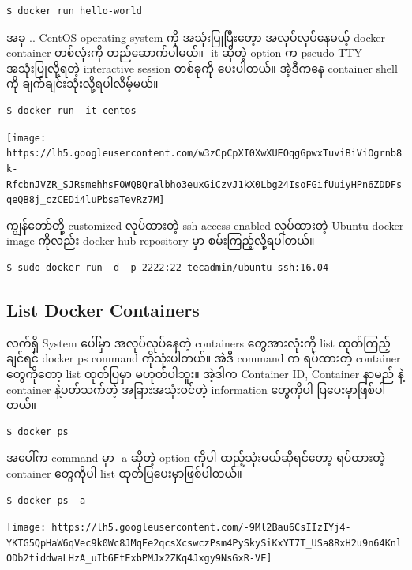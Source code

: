 \documentclass{article}
\begin{document}
\begin{verbatim}
$ docker run hello-world
\end{verbatim}

အခု .. CentOS operating system ကို အသုံးပြုပြီးတေ့ာ အလုပ်လုပ်နေမယ့်
docker container တစ်လုံးကို တည်ဆောက်ပါမယ်။ -it ဆိုတဲ့ option က
pseudo-TTY အသုံးပြုလို့ရတဲ့ interactive session တစ်ခုကို ပေးပါတယ်။
အဲ့ဒီကနေ container shell ကို ချက်ချင်းသုံးလို့ရပါလိမ့်မယ်။

\begin{verbatim}
$ docker run -it centos
\end{verbatim}

\texttt{[image: https://lh5.googleusercontent.com/w3zCpCpXI0XwXUEOqgGpwxTuviBiViOgrnb8k-RfcbnJVZR\_SJRsmehhsFOWQBQralbho3euxGiCzvJ1kX0Lbg24IsoFGifUuiyHPn6ZDDFsqeQB8j\_czCEDi4luPbsaTevRz7M]}

ကျွန်တော်တို့ customized လုပ်ထားတဲ့ ssh access enabled လုပ်ထားတဲ့ Ubuntu
docker image ကိုလည်း
\href{https://hub.docker.com/r/tecadmin/ubuntu-ssh/}{docker hub
repository} မှာ စမ်းကြည့်လို့ရပါတယ်။

\begin{verbatim}
$ sudo docker run -d -p 2222:22 tecadmin/ubuntu-ssh:16.04
\end{verbatim}

\subsection{List Docker Containers}\label{list-docker-containers}

လက်ရှိ System ပေါ်မှာ အလုပ်လုပ်နေတဲ့ containers တွေအားလုံးကို list
ထုတ်ကြည့်ချင်ရင် docker ps command ကိုသုံးပါတယ်။ အဲဒီ command က
ရပ်ထားတဲ့ container တွေကိုတော့ list ထုတ်ပြမှာ မဟုတ်ပါဘူး။ အဲ့ဒါက
Container ID, Container နာမည် နဲ့ container နဲ့ပတ်သက်တဲ့
အခြားအသုံးဝင်တဲ့ information တွေကိုပါ ပြပေးမှာဖြစ်ပါတယ်။

\begin{verbatim}
$ docker ps
\end{verbatim}

အပေါ်က command မှာ -a ဆိုတဲ့ option ကိုပါ ထည့်သုံးမယ်ဆိုရင်တော့
ရပ်ထားတဲ့ container တွေကိုပါ list ထုတ်ပြပေးမှာဖြစ်ပါတယ်။

\begin{verbatim}
$ docker ps -a
\end{verbatim}

\texttt{[image: https://lh5.googleusercontent.com/-9Ml2Bau6CsIIzIYj4-YKTG5QpHaW6qVec9k0Wc8JMqFe2qcsXcswczPsm4PySkySiKxYT7T\_USa8RxH2u9n64KnlODb2tiddwaLHzA\_uIb6EtExbPMJx2ZKq4Jxgy9NsGxR-VE]}
\end{document}
